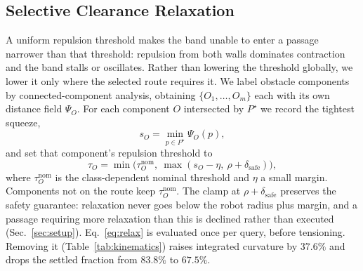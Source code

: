 \documentclass[conference]{IEEEtran}
\begin{document}
\subsection{Selective Clearance Relaxation}
A uniform repulsion threshold makes the band unable to enter a passage narrower than that threshold: repulsion from both walls dominates contraction and the band stalls or oscillates. Rather than lowering the threshold globally, we lower it only where the selected route requires it.
We label obstacle components by connected-component analysis, obtaining $\{O_1,\dots,O_m\}$ each with its own distance field $\Psi_{O}$. For each component $O$ intersected by $P^\star$ we record the tightest squeeze,
\begin{equation}
s_O=\min_{p\in P^\star}\Psi_O(p),
\end{equation}
and set that component's repulsion threshold to
\begin{equation}
\tau_O=\min\big(\tau_O^{\mathrm{nom}},\ \max(s_O-\eta,\ \rho+\delta_{\mathrm{safe}})\big),
\label{eq:relax}
\end{equation}
where $\tau_O^{\mathrm{nom}}$ is the class-dependent nominal threshold and $\eta$ a small margin. Components not on the route keep $\tau_O^{\mathrm{nom}}$. The clamp at $\rho+\delta_{\mathrm{safe}}$ preserves the safety guarantee: relaxation never goes below the robot radius plus margin, and a passage requiring more relaxation than this is declined rather than executed (Sec.~\ref{sec:setup}). Eq.~\eqref{eq:relax} is evaluated once per query, before tensioning. Removing it (Table~\ref{tab:kinematics}) raises integrated curvature by $37.6\%$ and drops the settled fraction from $83.8\%$ to $67.5\%$.
\end{document}
